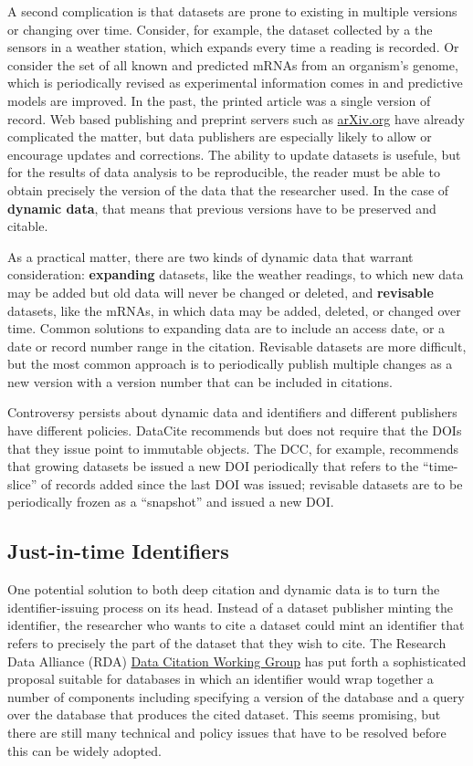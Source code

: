 \documentclass[10pt,twocolumn]{article}
\begin{document}
A second complication is that datasets are prone to existing in multiple versions or changing over time.
Consider, for example, the dataset collected by a the sensors in a weather station, which expands every time a reading is recorded.
Or consider the set of all known and predicted mRNAs from an organism's genome, which is periodically revised as experimental information comes in and predictive models are improved.
In the past, the printed article was a single version of record.
Web based publishing and preprint servers such as \href{http://arxiv.org/}{arXiv.org} have already complicated the matter, but data publishers are especially likely to allow or encourage updates and corrections.
The ability to update datasets is usefule, but for the results of data analysis to be reproducible, the reader must be able to obtain precisely the version of the data that the researcher used.
In the case of \textbf{dynamic data}, that means that previous versions have to be preserved and citable.

As a practical matter, there are two kinds of dynamic data that warrant consideration: \textbf{expanding} datasets, like the weather readings, to which new data may be added but old data will never be changed or deleted, and \textbf{revisable} datasets, like the mRNAs, in which data may be added, deleted, or changed over time.
Common solutions to expanding data are to include an access date, or a date or record number range in the citation.
Revisable datasets are more difficult, but the most common approach is to periodically publish multiple changes as a new version with a version number that can be included in citations.

Controversy persists about dynamic data and identifiers and different publishers have different policies.
DataCite recommends but does not require that the DOIs that they issue point to immutable objects.
The DCC, for example, recommends that growing datasets be issued a new DOI periodically that refers to the ``time-slice'' of records added since the last DOI was issued; revisable datasets are to be periodically frozen as a ``snapshot'' and issued a new DOI.

\subsection*{Just-in-time Identifiers}\label{just-in-time-identifiers}

One potential solution to both deep citation and dynamic data is to turn the identifier-issuing process on its head.
Instead of a dataset publisher minting the identifier, the researcher who wants to cite a dataset could mint an identifier that refers to precisely the part of the dataset that they wish to cite.
The Research Data Alliance (RDA) \href{http://rd-alliance.org/working-groups/data-citation-wg.html}{Data Citation Working Group} has put forth a sophisticated proposal suitable for databases in which an identifier would wrap together a number of components including specifying a version of the database and a query over the database that produces the cited dataset.
This seems promising, but there are still many technical and policy issues that have to be resolved before this can be widely adopted.
\end{document}
